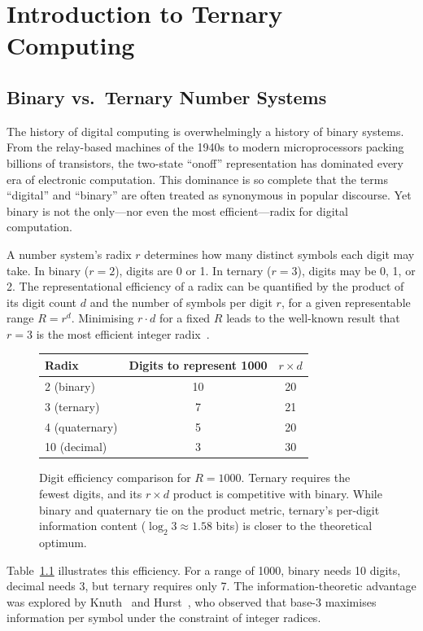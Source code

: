 \chapter{Introduction to Ternary Computing}

\section{Binary vs.\ Ternary Number Systems}

The history of digital computing is overwhelmingly a history of binary systems. From the relay-based machines of the 1940s to modern microprocessors packing billions of transistors, the two-state ``on\/off'' representation has dominated every era of electronic computation. This dominance is so complete that the terms ``digital'' and ``binary'' are often treated as synonymous in popular discourse. Yet binary is not the only---nor even the most efficient---radix for digital computation.

A number system's radix $r$ determines how many distinct symbols each digit may take. In binary ($r = 2$), digits are 0 or 1. In ternary ($r = 3$), digits may be 0, 1, or 2. The representational efficiency of a radix can be quantified by the product of its digit count $d$ and the number of symbols per digit $r$, for a given representable range $R = r^d$. Minimising $r \cdot d$ for a fixed $R$ leads to the well-known result that $r = 3$ is the most efficient integer radix~\cite{knuth1998art}.

\begin{figure}[h]
\centering
\begin{tabular}{lcc}
\toprule
Radix & Digits to represent 1000 & $r \times d$ \\
\midrule
2 (binary)  & 10 & 20 \\
3 (ternary) & 7  & 21 \\
4 (quaternary) & 5 & 20 \\
10 (decimal) & 3 & 30 \\
\bottomrule
\end{tabular}
\caption{Digit efficiency comparison for $R = 1000$. Ternary requires the fewest digits, and its $r \times d$ product is competitive with binary. While binary and quaternary tie on the product metric, ternary's per-digit information content ($\log_2 3 \approx 1.58$ bits) is closer to the theoretical optimum.}
\label{tab:efficiency}
\end{figure}

Table~\ref{tab:efficiency} illustrates this efficiency. For a range of 1000, binary needs 10 digits, decimal needs 3, but ternary requires only 7. The information-theoretic advantage was explored by Knuth~\cite{knuth1998art} and Hurst~\cite{hurst1989multiple}, who observed that base-3 maximises information per symbol under the constraint of integer radices.

